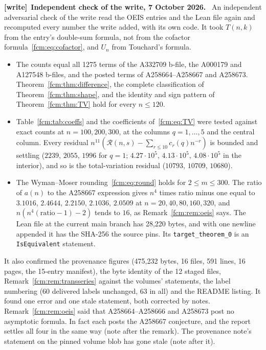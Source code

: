 \documentclass[11pt,letterpaper]{article}
\theoremstyle{remark}\newtheorem{remark}[theorem]{Remark}
\newcommand{\RR}{\mathcal R}
\newenvironment{writenote}[1][]{\par\smallskip\begingroup\small
 \noindent\textbf{[write]}\if\relax\detokenize{#1}\relax\else~\textbf{#1.}\fi\ }%
 {\par\endgroup\smallskip}
\begin{document}
\begin{writenote}[Independent check of the write, 7 October 2026]
An independent adversarial check of the write read the OEIS entries and the
Lean file again and recomputed every number the write added, with its own
code. It took $T(n,k)$ from the entry's double-sum formula, not from the
cofactor formula~\eqref{fcm:eq:cofactor}, and $U_n$ from Touchard's formula.
\begin{itemize}
\item The counts equal all 1275 terms of the A332709 b-file, the A000179 and
A127548 b-files, and the posted terms of A258664--A258667 and A258673.
Theorem~\ref{fcm:thm:difference}, the complete classification of
Theorem~\ref{fcm:thm:shape}, and the identity and sign pattern of
Theorem~\ref{fcm:thm:TV} hold for every $n\le120$.
\item Table~\ref{fcm:tab:coeffs} and the coefficients of~\eqref{fcm:eq:TV}
were tested against exact counts at $n=100,200,300$, at the columns $q=1,\ldots,5$
and the central column. Every residual $n^{11}(\RR(n,s)-\sum_{r\le10}c_r(q)n^{-r})$
is bounded and settling ($2239$, $2055$, $1996$ for $q=1$; $4.27\cdot10^5$,
$4.13\cdot10^5$, $4.08\cdot10^5$ in the interior), and so is the
total-variation residual ($10793$, $10709$, $10680$).
\item The Wyman--Moser rounding~\eqref{fcm:eq:round} holds for
$2\le m\le300$. The ratio of $a(n)$ to the A258667 expression gives $n^4$
times ratio minus one equal to $3.1016$, $2.4644$, $2.2150$, $2.1036$, $2.0509$
at $n=20,40,80,160,320$, and $n(n^4(\text{ratio}-1)-2)$ tends to $16$, as
Remark~\ref{fcm:rem:oeis} says. The Lean file at the current main branch has
28,220 bytes, and with one newline appended it has the SHA-256 the source pins.
Its \texttt{target\_theorem\_0} is an \texttt{IsEquivalent} statement.
\end{itemize}
It also confirmed the provenance figures (475,232 bytes, 16 files, 591 lines,
16 pages, the 15-entry manifest), the byte identity of the 12 staged files,
Remark~\ref{fcm:rem:transseries} against the volumes' statements, the label
numbering (60 delivered labels unchanged, 63 in all) and the README listing.
It found one error and one stale statement, both corrected by notes. Remark~\ref{fcm:rem:oeis}
said that A258664--A258666 and A258673 post no asymptotic formula. In fact
each posts the A258667 conjecture, and the report settles all four in the same
way (note after the remark). The provenance note's statement on the pinned
volume blob has gone stale (note after it).
\end{writenote}
\end{document}
